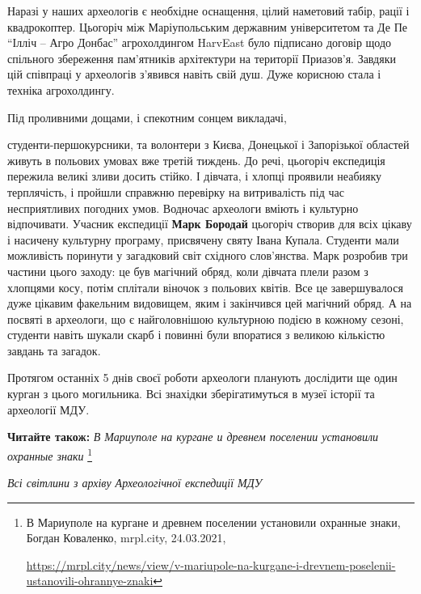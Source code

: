 Наразі у наших археологів є необхідне оснащення, цілий наметовий табір, рації і
квадрокоптер. Цьогоріч між Маріупольським державним університетом та Де Пе
\enquote{Ілліч – Агро Донбас} агрохолдингом HarvEast було підписано договір щодо
спільного збереження пам'ятників архітектури на території Приазов'я. Завдяки
цій співпраці у археологів з'явився навіть свій душ. Дуже корисною стала і
техніка агрохолдингу.


Під проливними дощами, і спекотним сонцем викладачі,\par\noindent студенти-першокурсники,
та волонтери з Києва, Донецької і Запорізької областей живуть в польових умовах
вже третій тиждень. До речі, цьогоріч експедиція пережила великі зливи досить
стійко. І дівчата, і хлопці проявили неабияку терплячість, і пройшли справжню
перевірку на витривалість під час несприятливих погодних умов. Водночас
археологи вміють і культурно відпочивати. Учасник експедиції \textbf{Марк Бородай}
цьогоріч створив для всіх цікаву і насичену культурну програму, присвячену
святу Івана Купала. Студенти мали можливість поринути у загадковий світ
східного слов'янства. Марк розробив три частини цього заходу: це був магічний
обряд, коли дівчата плели разом з хлопцями косу, потім сплітали віночок з
польових квітів. Все це завершувалося дуже цікавим факельним видовищем, яким і
закінчився цей магічний обряд. А на посвяті в археологи, що є найголовнішою
культурною подією в кожному сезоні, студенти навіть шукали скарб і повинні були
впоратися з великою кількістю завдань та загадок.


Протягом останніх 5 днів своєї роботи археологи планують дослідити ще один
курган з цього могильника. Всі знахідки зберігатимуться в музеї історії та
археології МДУ.

\textbf{Читайте також:} \emph{В Мариуполе на кургане и древнем поселении установили охранные знаки}%
\footnote{В Мариуполе на кургане и древнем поселении установили охранные знаки, Богдан Коваленко, mrpl.city, 24.03.2021, \par%
\url{https://mrpl.city/news/view/v-mariupole-na-kurgane-i-drevnem-poselenii-ustanovili-ohrannye-znaki}
}

\emph{Всі світлини з архіву Археологічної експедиції МДУ}
